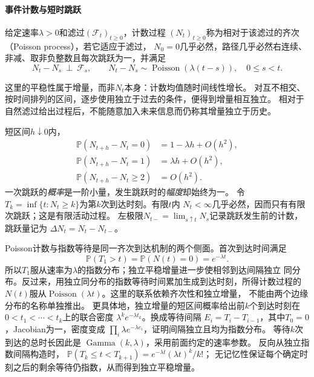 \paragraph{事件计数与短时跳跃}
\begin{definition}[齐次Poisson过程]
\label{def:rv-poisson-process}
给定速率\(\lambda>0\)和滤过\((\mathcal F_t)_{t\geq0}\)，计数过程
\((N_t)_{t\geq0}\)称为相对于该滤过的齐次（Poisson process），若它适应于滤过，
\(N_0=0\)几乎必然，路径几乎必然右连续、非减、取非负整数且每次跳跃为一，并满足
\[
N_t-N_s\ \perp\ \mathcal F_s,\qquad
N_t-N_s\sim\operatorname{Poisson}(\lambda(t-s)),
\quad 0\leq s<t.
\]
\end{definition}
这里的平稳性属于增量，而非\(N_t\)本身：计数均值随时间线性增长。
对互不相交、按时间排列的区间，逐步使用独立于过去的条件，便得到增量相互独立。
相对于自然滤过给出过程后，不能随意加入未来信息而仍称其增量独立于历史。

短区间\(h\downarrow0\)内，
\[
\begin{aligned}
\mathbb P(N_{t+h}-N_t=0)&=1-\lambda h+O(h^2),\\
\mathbb P(N_{t+h}-N_t=1)&=\lambda h+O(h^2),\\
\mathbb P(N_{t+h}-N_t\geq2)&=O(h^2).
\end{aligned}
\]
一次跳跃的\emph{概率}是一阶小量，发生跳跃时的\emph{幅度}却始终为一。
令\(T_k=\inf\{t:N_t\geq k\}\)为第\(k\)次到达时刻。有限\(t\)内
\(N_t<\infty\)几乎必然，因而只有有限次跳跃；这是有限活动过程。
左极限\(N_{t-}=\lim_{s\uparrow t}N_s\)记录跳跃发生前的计数，跳跃量记为
\(\Delta N_t=N_t-N_{t-}\)。

Poisson计数与指数等待是同一齐次到达机制的两个侧面。首次到达时间满足
\[
  \mathbb{P}(T_1>t)
  =
  \mathbb{P}(N(t)=0)
  =
  e^{-\lambda t}.
\]
所以\(T_1\)服从速率为\(\lambda\)的指数分布；独立平稳增量进一步使相邻到达间隔独立
同分布。反过来，用独立同分布的指数等待时间累加生成到达时刻，所得计数过程的
\(N(t)\)服从\(\operatorname{Poisson}(\lambda t)\)。这里的联系依赖齐次性和独立增量，
不能由两个边缘分布的名称单独推出。
更具体地，独立增量的短区间概率给出前\(k\)个到达时刻在
\(0<t_1<\cdots<t_k\)上的联合密度
\(\lambda^k e^{-\lambda t_k}\)。换成等待间隔
\(E_i=T_i-T_{i-1}\)，其中\(T_0=0\)，Jacobian为一，密度变成
\(\prod_i\lambda e^{-\lambda e_i}\)，证明间隔独立且均为指数分布。
等待\(k\)次到达的总时长因此是
\(\operatorname{Gamma}(k,\lambda)\)，采用前面约定的速率参数。
反向从独立指数间隔构造时，
\(\mathbb P(T_k\leq t<T_{k+1})=e^{-\lambda t}(\lambda t)^k/k!\)；
无记忆性保证每个确定时刻之后的剩余等待仍指数，从而得到独立平稳增量。

